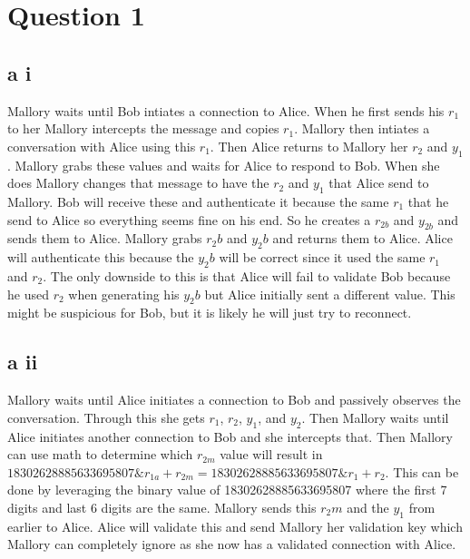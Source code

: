 \documentclass{article}
\begin{document}
\section*{Question 1} %
	\label{sec:question_1}

	\subsection*{a i} %
	\label{sub:a_}
	Mallory waits until Bob intiates a connection to Alice. When he first sends his $r_1$ to her Mallory intercepts the message and copies $r_1$. Mallory then intiates a conversation with Alice using this $r_1$. Then Alice returns to Mallory her $r_2$ and $y_1$. Mallory grabs these values and waits for Alice to respond to Bob. When she does Mallory changes that message to have the $r_2$ and $y_1$ that Alice send to Mallory. Bob will receive these and authenticate it because the same $r_1$ that he send to Alice so everything seems fine on his end. So he creates a $r_{2b}$ and $y_{2b}$ and sends them to Alice. Mallory grabs $r_2b$ and $y_2b$ and returns them to Alice. Alice will authenticate this because the $y_2b$ will be correct since it used the same $r_1$ and $r_2$. The only downside to this is that Alice will fail to validate Bob because he used $r_2$ when generating his $y_2b$ but Alice initially sent a different value. This might be suspicious for Bob, but it is likely he will just try to reconnect.



	\subsection*{a ii} %
	\label{sub:b_}
	Mallory waits until Alice initiates a connection to Bob and passively observes the conversation. Through this she gets $r_1$, $r_2$, $y_1$, and $y_2$. Then Mallory waits until Alice initiates another connection to Bob and she intercepts that. Then Mallory can use math to determine which $r_{2m}$ value will result in $18302628885633695807\&r_{1a} + r_{2m} = 18302628885633695807\&r_{1} + r_{2}$. This can be done by leveraging the binary value of 18302628885633695807 where the first 7 digits and last 6 digits are the same. Mallory sends this ${r_2m}$ and the $y_1$ from earlier to Alice. Alice will validate this and send Mallory her validation key which Mallory can completely ignore as she now has a validated connection with Alice.

\end{document}
